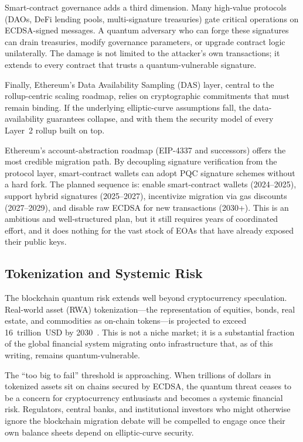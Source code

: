 Smart-contract governance adds a third dimension.  Many high-value protocols (DAOs, DeFi lending pools, multi-signature treasuries) gate critical operations on ECDSA-signed messages.  A quantum adversary who can forge these signatures can drain treasuries, modify governance parameters, or upgrade contract logic unilaterally.  The damage is not limited to the attacker's own transactions; it extends to every contract that trusts a quantum-vulnerable signature.

Finally, Ethereum's Data Availability Sampling (DAS) layer, central to the rollup-centric scaling roadmap, relies on cryptographic commitments that must remain binding.  If the underlying elliptic-curve assumptions fall, the data-availability guarantees collapse, and with them the security model of every Layer~2 rollup built on top.

Ethereum's account-abstraction roadmap (EIP-4337 and successors) offers the most credible migration path.  By decoupling signature verification from the protocol layer, smart-contract wallets can adopt PQC signature schemes without a hard fork.  The planned sequence is: enable smart-contract wallets (2024--2025), support hybrid signatures (2025--2027), incentivize migration via gas discounts (2027--2029), and disable raw ECDSA for new transactions (2030+).  This is an ambitious and well-structured plan, but it still requires years of coordinated effort, and it does nothing for the vast stock of EOAs that have already exposed their public keys.

\subsection{Tokenization and Systemic Risk}
\label{subsec:tokenization-risk}

The blockchain quantum risk extends well beyond cryptocurrency speculation.  Real-world asset (RWA) tokenization---the representation of equities, bonds, real estate, and commodities as on-chain tokens---is projected to exceed 16~trillion~USD by 2030~\cite{BabbushZalcmanGidney2026}.  This is not a niche market; it is a substantial fraction of the global financial system migrating onto infrastructure that, as of this writing, remains quantum-vulnerable.

The ``too big to fail'' threshold is approaching.  When trillions of dollars in tokenized assets sit on chains secured by ECDSA, the quantum threat ceases to be a concern for cryptocurrency enthusiasts and becomes a systemic financial risk.  Regulators, central banks, and institutional investors who might otherwise ignore the blockchain migration debate will be compelled to engage once their own balance sheets depend on elliptic-curve security.

